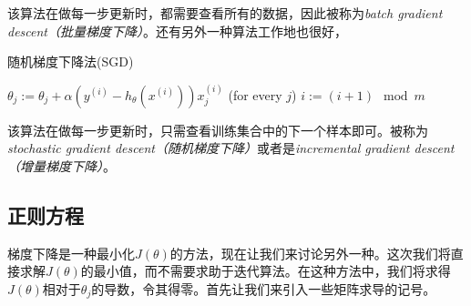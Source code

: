 \documentclass[hyperref, UTF8]{ctexart}
\begin{document}
该算法在做每一步更新时，都需要查看所有的数据，因此被称为\emph{batch gradient descent（批量梯度下降）}。还有另外一种算法工作地也很好，
\begin{algorithm}
\caption{随机梯度下降法(SGD)}  
\begin{algorithmic}    
\REPEAT  
\STATE $\theta_j := \theta_j + \alpha(y^{(i)} - h_\theta(x^{(i)}))x^{(i)}_j$ (for every $j$)
\STATE $i := (i + 1) \mod m$
\end{algorithmic}  
\end{algorithm}

该算法在做每一步更新时，只需查看训练集合中的下一个样本即可。被称为\emph{stochastic gradient descent（随机梯度下降）}或者是\emph{incremental gradient descent（增量梯度下降）}。

\subsection{正则方程}
梯度下降是一种最小化$J(\theta)$的方法，现在让我们来讨论另外一种。这次我们将直接求解$J(\theta)$的最小值，而不需要求助于迭代算法。在这种方法中，我们将求得$J(\theta)$相对于$\theta_j$的导数，令其得零。首先让我们来引入一些矩阵求导的记号。
\end{document}
